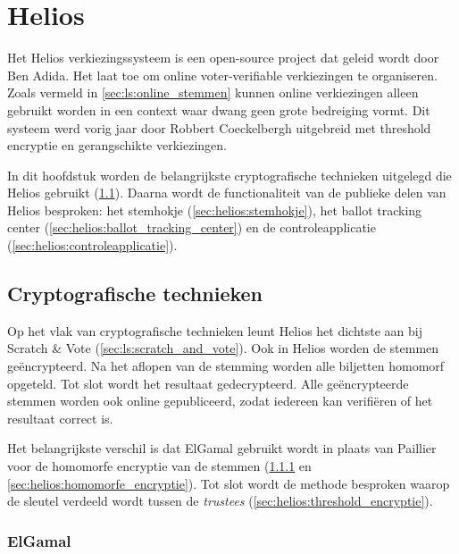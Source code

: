 %
%

\chapter{Helios}
\label{chap:helios}

Het Helios verkiezingssysteem is een open-source project dat geleid wordt door Ben Adida.\cite{adida_helios} Het laat toe om online voter-verifiable verkiezingen te organiseren. Zoals vermeld in \ref{sec:ls:online_stemmen} kunnen online verkiezingen alleen gebruikt worden in een context waar dwang geen grote bedreiging vormt. Dit systeem werd vorig jaar door Robbert Coeckelbergh uitgebreid met threshold encryptie en gerangschikte verkiezingen.\cite{coeckelbergh_toepassing_en_uitbreiding_van_het_helios_online_verkiezingssysteem} 

\npar In dit hoofdstuk worden de belangrijkste cryptografische technieken uitgelegd die Helios gebruikt (\ref{sec:helios:cryptografische_technieken}). Daarna wordt de functionaliteit van de publieke delen van Helios besproken: het stemhokje (\ref{sec:helios:stemhokje}), het ballot tracking center (\ref{sec:helios:ballot_tracking_center}) en de controleapplicatie (\ref{sec:helios:controleapplicatie}).

\section{Cryptografische technieken}
\label{sec:helios:cryptografische_technieken}

Op het vlak van cryptografische technieken leunt Helios het dichtste aan bij Scratch \& Vote (\ref{sec:ls:scratch_and_vote}). Ook in Helios worden de stemmen ge\"encrypteerd. Na het aflopen van de stemming worden alle biljetten homomorf opgeteld. Tot slot wordt het resultaat gedecrypteerd. Alle ge\"encrypteerde stemmen worden ook online gepubliceerd, zodat iedereen kan verifi\"eren of het resultaat correct is.

\npar Het belangrijkste verschil is dat ElGamal gebruikt wordt in plaats van Paillier voor de homomorfe encryptie van de stemmen (\ref{sec:helios:elgamal} en \ref{sec:helios:homomorfe_encryptie}). Tot slot wordt de methode besproken waarop de sleutel verdeeld wordt tussen de \textit{trustees} (\ref{sec:helios:threshold_encryptie}).

\subsection[ElGamal]{ElGamal~\cite{elgamal_elgamal}}
\label{sec:helios:elgamal}

